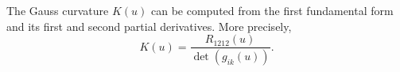 The Gauss curvature $K(u)$ can be computed from the first fundamental form and its first and second partial derivatives. More precisely,
$$K(u) = \frac{R_{1212}(u)}{\det(g_{ik}(u))}.$$
